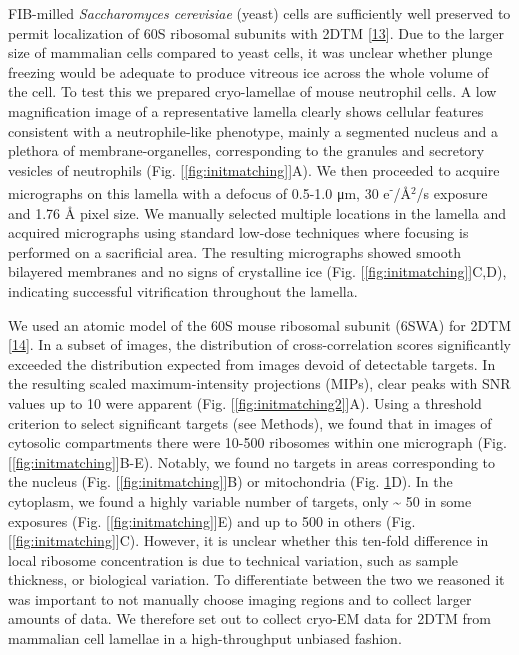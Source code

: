 \documentclass[
]{article}
\begin{document}
FIB-milled \emph{Saccharomyces cerevisiae} (yeast) cells are sufficiently
well preserved to permit localization of 60S ribosomal subunits with
2DTM {[}\protect\hyperlink{ref-T1Qr0xyP}{13}{]}. Due to the larger size of
mammalian cells compared to yeast cells, it was unclear whether plunge
freezing would be adequate to produce vitreous ice across the whole
volume of the cell. To test this we prepared cryo-lamellae of mouse
neutrophil cells. A low magnification image of a representative lamella
clearly shows cellular features consistent with a neutrophile-like
phenotype, mainly a segmented nucleus and a plethora of
membrane-organelles, corresponding to the granules and secretory
vesicles of neutrophils (Fig. {[}\ref{fig:initmatching}{]}A). We then proceeded
to acquire micrographs on this lamella with a defocus of 0.5-1.0 μm, 30
e\textsuperscript{-}/Å\(^2\)/s exposure and 1.76 Å pixel size. We manually selected
multiple locations in the lamella and acquired micrographs using
standard low-dose techniques where focusing is performed on a
sacrificial area. The resulting micrographs showed smooth bilayered
membranes and no signs of crystalline ice (Fig. {[}\ref{fig:initmatching}{]}C,D),
indicating successful vitrification throughout the lamella.

We used an atomic model of the 60S mouse ribosomal subunit (6SWA) for
2DTM {[}\protect\hyperlink{ref-sbkam02a}{14}{]}. In a subset of images, the
distribution of cross-correlation scores significantly exceeded the
distribution expected from images devoid of detectable targets. In the
resulting scaled maximum-intensity projections (MIPs), clear peaks with
SNR values up to 10 were apparent (Fig. {[}\ref{fig:initmatching2}{]}A). Using a
threshold criterion to select significant targets (see Methods), we
found that in images of cytosolic compartments there were 10-500
ribosomes within one micrograph (Fig. {[}\ref{fig:initmatching}{]}B-E). Notably,
we found no targets in areas corresponding to the nucleus (Fig.
{[}\ref{fig:initmatching}{]}B) or mitochondria (Fig. \protect\hyperlink{fig:initmatching}{1}D). In
the cytoplasm, we found a highly variable number of targets, only \textasciitilde{} 50
in some exposures (Fig. {[}\ref{fig:initmatching}{]}E) and up to 500 in others
(Fig. {[}\ref{fig:initmatching}{]}C). However, it is unclear whether this
ten-fold difference in local ribosome concentration is due to technical
variation, such as sample thickness, or biological variation. To
differentiate between the two we reasoned it was important to not
manually choose imaging regions and to collect larger amounts of data.
We therefore set out to collect cryo-EM data for 2DTM from mammalian
cell lamellae in a high-throughput unbiased fashion.
\end{document}
